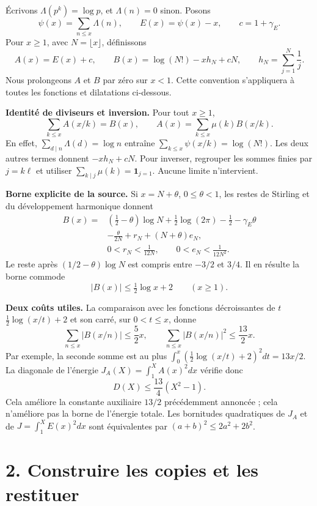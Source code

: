 \documentclass[
  11pt,
  a4paper,
]{article}
\begin{document}
Écrivons \(\Lambda(p^k)=\log p\), et \(\Lambda(n)=0\) sinon. Posons \[
\psi(x)=\sum_{n\le x}\Lambda(n),\qquad
E(x)=\psi(x)-x,\qquad c=1+\gamma_E.
\] Pour \(x\ge1\), avec \(N=\lfloor x\rfloor\), définissons \[
A(x)=E(x)+c,\qquad
B(x)=\log(N!)-x h_N+cN,\qquad
h_N=\sum_{j=1}^N\frac1j.
\] Nous prolongeons \(A\) et \(B\) par zéro sur \(x<1\). Cette
convention s'appliquera à toutes les fonctions et dilatations
ci-dessous.

\textbf{Identité de diviseurs et inversion.} Pour tout \(x\ge1\), \[
\sum_{k\le x}A(x/k)=B(x),\qquad
A(x)=\sum_{k\le x}\mu(k)B(x/k).
\] En effet, \(\sum_{d\mid n}\Lambda(d)=\log n\) entraîne
\(\sum_{k\le x}\psi(x/k)=\log(N!)\). Les deux autres termes donnent
\(-xh_N+cN\). Pour inverser, regrouper les sommes finies par \(j=k\ell\)
et utiliser \(\sum_{k\mid j}\mu(k)=\mathbf1_{j=1}\). Aucune limite
n'intervient.

\textbf{Borne explicite de la source.} Si \(x=N+\theta\),
\(0\le\theta<1\), les restes de Stirling et du développement harmonique
donnent \[
\begin{aligned}
B(x)={}&(\tfrac12-\theta)\log N
 +\tfrac12\log(2\pi)-\tfrac12-\gamma_E\theta\\
 &-\frac{\theta}{2N}+r_N+(N+\theta)e_N,\\
&0<r_N<\frac1{12N},\qquad 0<e_N<\frac1{12N^2}.
\end{aligned}
\] Le reste après \((1/2-\theta)\log N\) est compris entre \(-3/2\) et
\(3/4\). Il en résulte la borne commode \[
|B(x)|\le\tfrac12\log x+2\qquad(x\ge1).
\]

\textbf{Deux coûts utiles.} La comparaison avec les fonctions
décroissantes de \(t\) \(\tfrac12\log(x/t)+2\) et son carré, sur
\(0<t\le x\), donne \[
\sum_{n\le x}|B(x/n)|\le\frac52 x,
\qquad
\sum_{n\le x}|B(x/n)|^2\le\frac{13}{2}x.
\] Par exemple, la seconde somme est au plus
\(\int_0^x(\frac12\log(x/t)+2)^2dt=13x/2\). La diagonale de l'énergie
\(J_A(X)=\int_1^XA(x)^2dx\) vérifie donc \[
D(X)\le\frac{13}{4}(X^2-1).
\] Cela améliore la constante auxiliaire \(13/2\) précédemment annoncée
; cela n'améliore pas la borne de l'énergie totale. Les bornitudes
quadratiques de \(J_A\) et de \(J=\int_1^XE(x)^2dx\) sont équivalentes
par \((a+b)^2\le2a^2+2b^2\).

\newpage

\hypertarget{construire-les-copies-et-les-restituer}{%
\section{2. Construire les copies et les
restituer}\label{construire-les-copies-et-les-restituer}}
\end{document}
